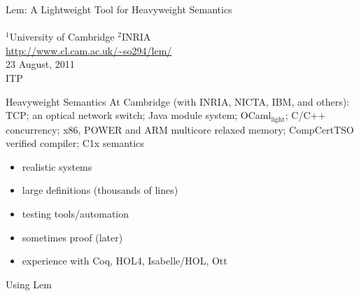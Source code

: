 \documentclass[pdf,nototal]{prosper}
\newcommand{\titlec}{\color{titlec}}
\newcommand{\mytitlefont}{\titlec\usefont{T1}{phv}{m}{n}\fontsize{16.4pt}{16pt}\selectfont}
\begin{document}
\begin{slide}{}
\begin{center}
\vspace{24pt}
{\mytitlefont Lem: A Lightweight Tool for Heavyweight Semantics}\\[18pt]
{\fontsize{14pt}{14pt}}\\[12pt]
{$^1$University of Cambridge \qquad $^2$INRIA}\\[12pt]
\url{http://www.cl.cam.ac.uk/~so294/lem/}\\[24pt]
23 August, 2011\\
ITP

\end{center}
\end{slide}

\begin{slide}{Heavyweight Semantics}
At Cambridge (with INRIA, NICTA, IBM, and others):\\
TCP; an optical network switch; Java module system;
OCaml${}_{\text{light}}$; {\color{FriendlyBlue}C/C++ concurrency};
x86, {\color{FriendlyBlue}POWER} and {\color{FriendlyBlue}ARM}
multicore relaxed memory; CompCertTSO verified compiler; {\color{FriendlyBlue}C1x} semantics

\vspace{12pt}

\begin{itemize}
\item realistic systems
\item large definitions (thousands of lines)
\item testing tools/automation
\item sometimes proof (later)
\item experience with Coq, HOL4, Isabelle/HOL, Ott
\end{itemize}

{\small \color{FriendlyBlue}Using Lem}

\end{slide}
\end{document}
